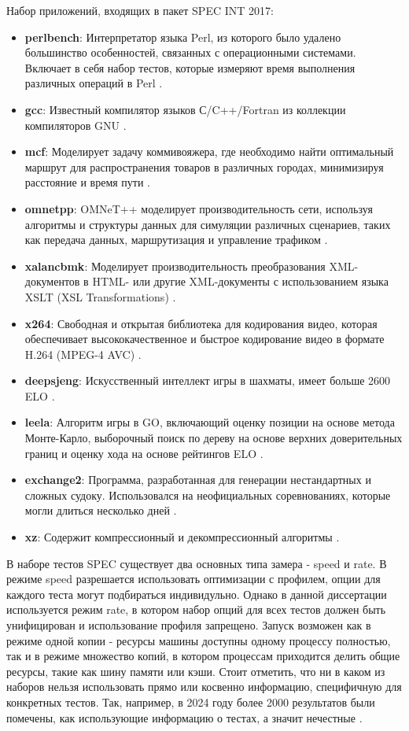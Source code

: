 Набор приложений, входящих в пакет SPEC INT 2017:
\begin{itemize}
		\item  \textbf{perlbench}:  Интерпретатор языка Perl, из которого было удалено большинство особенностей, связанных с операционными системами. Включает в себя набор тестов, которые измеряют время выполнения различных операций в Perl \cite{siever1998perl}.
		\item  \textbf{gcc}: Известный компилятор языков С/C++/Fortran из коллекции компиляторов GNU \cite{gough2004introduction}. 
		\item  \textbf{mcf}: Моделирует задачу коммивояжера, где необходимо найти оптимальный маршрут для распространения товаров в различных городах, минимизируя расстояние и время пути \cite{lobel1999solving}.
		\item  \textbf{omnetpp}: OMNeT++ моделирует производительность  сети, используя алгоритмы и структуры данных для симуляции различных сценариев, таких как передача данных, маршрутизация и управление трафиком \cite{varga2019practical}.
		\item  \textbf{xalancbmk}: Моделирует производительность преобразования XML-документов в HTML- или другие XML-документы с использованием языка XSLT (XSL Transformations) \cite{euzenat2002xml}.
		\item  \textbf{x264}: Свободная и открытая библиотека для кодирования видео, которая обеспечивает высококачественное и быстрое кодирование видео в формате H.264 (MPEG-4 AVC) \cite{merritt2006x264}.
		\item  \textbf{deepsjeng}: Искусственный интеллект игры в шахматы, имеет больше 2600 ELO  \cite{sandin2021ssdf}.
		\item  \textbf{leela}: Алгоритм игры в GO, включающий оценку позиции на основе метода Монте-Карло, выборочный поиск по дереву на основе верхних доверительных границ и оценку хода на основе рейтингов ELO \cite{choi2022does} .
		\item  \textbf{exchange2}: Программа, разработанная для генерации нестандартных и сложных судоку. Использовался на неофициальных соревнованиях, которые могли длиться несколько дней \cite{10.1145/1124708.1124709}. 
		\item  \textbf{xz}: Содержит компрессионный и декомпрессионный алгоритмы \cite{koranne2011compression}. 
\end{itemize}

В наборе тестов SPEC существует два основных типа замера - speed и rate. В режиме speed разрешается использовать оптимизации с профилем, опции для каждого теста могут подбираться индивидульно. Однако в данной диссертации используется режим rate, в котором набор опций для всех тестов должен быть унифицирован и использование профиля запрещено. Запуск возможен как в режиме  одной копии - ресурсы машины доступны одному процессу полностью, так и  в режиме множество копий, в котором процессам приходится делить общие ресурсы, такие как шину памяти или кэши. Стоит отметить, что ни в каком из наборов нельзя использовать прямо или косвенно информацию, специфичную для конкретных тестов. Так, например, в 2024 году более 2000 результатов  были помечены, как использующие информацию о тестах, а значит нечестные \cite{cliffFlagged}.

